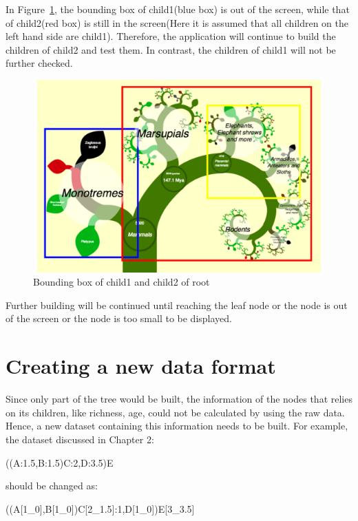 \documentclass[MSc]{icldt}
\begin{document}
In Figure~\ref{fig:screenAndBounding2}, the bounding box of child1(blue box) is out of the screen, while that of child2(red box) is still in the screen(Here it is assumed that all children on the left hand side are child1). Therefore, the application will continue to build the children of child2 and test them. In contrast, the children of child1 will not be further checked. 

\begin{figure}[H]
  \centering
  \includegraphics [width=12.5cm,height=7.4cm]{ScreenAndBounding2}
  \caption{Bounding box of child1 and child2 of root}
  \label{fig:screenAndBounding2}
\end{figure}

Further building will be continued until reaching the leaf node or the node is out of the screen or the node is too small to be displayed.



\section{Creating a new data format}

Since only part of the tree would be built, the information of the nodes that relies on its children, like richness, age, could not be calculated by using the raw data. Hence, a new dataset containing this information needs to be built. For example, the dataset discussed in Chapter 2: 

\begin{center}
	((A:1.5,B:1.5)C:2,D:3.5)E
\end{center}

should be changed as:

\begin{center}
	((A[1\_0],B[1\_0])C[2\_1.5]:1,D[1\_0])E[3\_3.5]
\end{center}
\end{document}
